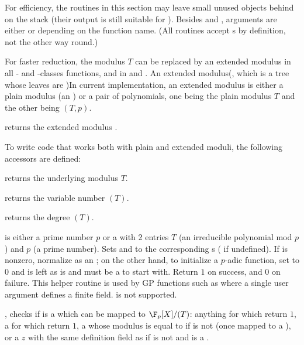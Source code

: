 For efficiency, the routines in this section may leave small unused objects
behind on the stack (their output is still suitable for ).
Besides  and , arguments are either  or 
depending on the function name. (All  routines accept s by
definition, not the other way round.)


For faster reduction, the modulus $T$ can be replaced by an extended modulus
in all - and -classes functions, and in  and
. An extended modulus(, which is a tree whose leaves are )In
current implementation, an extended modulus is either a plain modulus (an
) or a pair of polynomials, one being the plain modulus $T$ and the
other being $(T,p)$.

 returns the extended modulus .

To write code that works both with plain and extended moduli, the following
accessors are defined:

 returns the underlying modulus $T$.

 returns the variable number $(T)$.

 returns the degree $(T)$.


  is either
a prime number $p$ or a  with 2 entries $T$ (an irreducible
polynomial mod $p$) and $p$ (a prime number). Sets  and 
to the corresponding s ( if undefined). If 
is nonzero, normalize  as an ; on the other hand,
to initialize a $p$-adic function, set  to $0$ and  is left
as is and must be a  to start with. Return $1$ on success, and $0$ on
failure. This helper routine is used by GP functions such as 
where a single user argument defines a finite field.  is not
supported.

, checks if  is a 
which can be mapped to $\F_p[X]/(T)$: anything for which  return
$1$, a  for which  return $1$, a 
whose modulus is equal to  if  is not  (once mapped
to a ), or a  $z$ with the same definition field as 
if  is not  and is a .

